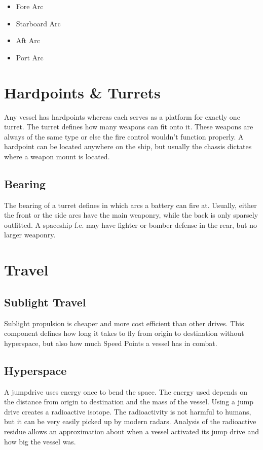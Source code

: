 \begin{itemize}
  \item Fore Arc
  \item Starboard Arc
  \item Aft Arc
  \item Port Arc
\end{itemize}

\section{Hardpoints \& Turrets}
\label{sec:Hardpoints & Turrets}

Any vessel has hardpoints whereas each serves as a platform for exactly one turret. The turret defines how many weapons can fit onto it. These weapons are always of the same type or else the fire control wouldn't function properly. A hardpoint can be located anywhere on the ship, but usually the chassis dictates where a weapon mount is located.

\subsection{Bearing}
\label{sub:Bearing}

The bearing of a turret defines in which arcs a battery can fire at. Usually, either the front or the side arcs have the main weaponry, while the back is only sparsely outfitted. A spaceship f.e. may have fighter or bomber defense in the rear, but no larger weaponry.

\section{Travel}
\label{sec:Travel}

\subsection{Sublight Travel}
\label{sub:Sublight Travel}

Sublight propulsion is cheaper and more cost efficient than other drives. This component defines how long it takes to fly from origin to destination without hyperspace, but also how much Speed Points a vessel has in combat.

\subsection{Hyperspace}
\label{sub:Hyperspace}

A jumpdrive uses energy once to bend the space. The energy used depends on the distance from origin to destination and the mass of the vessel. Using a jump drive creates a radioactive isotope. The radioactivity is not harmful to humans, but it can be very easily picked up by modern radars. Analysis of the radioactive residue allows an approximation about when a vessel activated its jump drive and how big the vessel was.

